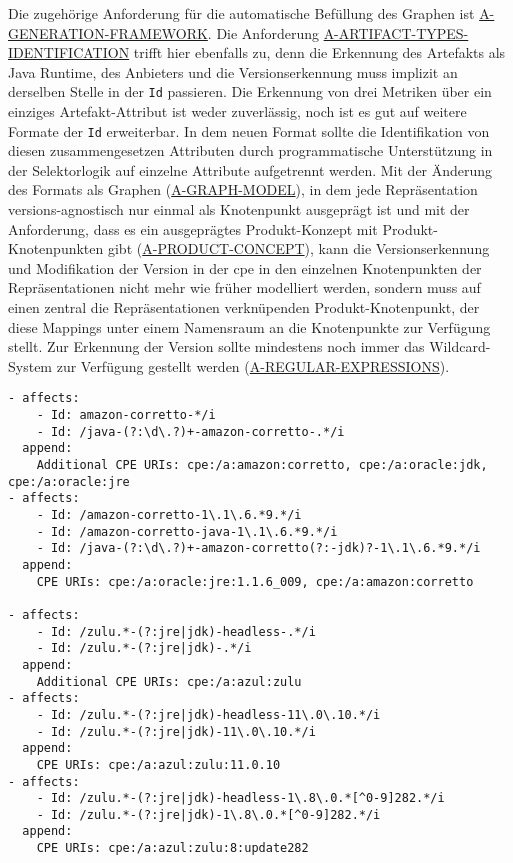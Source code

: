 Die zugehörige Anforderung für die automatische Befüllung des Graphen ist \hyperref[subsec:req-generated-data]{A-GENERATION-FRAMEWORK}.
Die Anforderung \hyperref[subsec:req-type-specific-matching]{A-ARTIFACT-TYPES-IDENTIFICATION} trifft hier ebenfalls zu, denn die Erkennung des Artefakts als Java Runtime, des Anbieters und die Versionserkennung muss implizit an derselben Stelle in der \texttt{Id} passieren.
Die Erkennung von drei Metriken über ein einziges Artefakt-Attribut ist weder zuverlässig, noch ist es gut auf weitere Formate der \texttt{Id} erweiterbar.
In dem neuen Format sollte die Identifikation von diesen zusammengesetzen Attributen durch programmatische Unterstützung in der Selektorlogik auf einzelne Attribute aufgetrennt werden.
Mit der Änderung des Formats als Graphen (\hyperref[subsec:req-format-product-graph]{A-GRAPH-MODEL}), in dem jede Repräsentation versions-agnostisch nur einmal als Knotenpunkt ausgeprägt ist und mit der Anforderung, dass es ein ausgeprägtes Produkt-Konzept mit Produkt-Knotenpunkten gibt (\hyperref[subsec:req-product-concept]{A-PRODUCT-CONCEPT}), kann die Versionserkennung und Modifikation der Version in der \acrshort{cpe} in den einzelnen Knotenpunkten der Repräsentationen nicht mehr wie früher modelliert werden, sondern muss auf einen zentral die Repräsentationen verknüpenden Produkt-Knotenpunkt, der diese Mappings unter einem Namensraum an die Knotenpunkte zur Verfügung stellt.
Zur Erkennung der Version sollte mindestens noch immer das Wildcard-System zur Verfügung gestellt werden (\hyperref[subsec:req-regex-support]{A-REGULAR-EXPRESSIONS}).

\begin{lstlisting}[style=yaml,caption={Java-Runtime-Korrelation mit Versionstransformation},label={lst:reference-case-java-runtimes},basicstyle=\ttfamily\scriptsize]
- affects:
    - Id: amazon-corretto-*/i
    - Id: /java-(?:\d\.?)+-amazon-corretto-.*/i
  append:
    Additional CPE URIs: cpe:/a:amazon:corretto, cpe:/a:oracle:jdk, cpe:/a:oracle:jre
- affects:
    - Id: /amazon-corretto-1\.1\.6.*9.*/i
    - Id: /amazon-corretto-java-1\.1\.6.*9.*/i
    - Id: /java-(?:\d\.?)+-amazon-corretto(?:-jdk)?-1\.1\.6.*9.*/i
  append:
    CPE URIs: cpe:/a:oracle:jre:1.1.6_009, cpe:/a:amazon:corretto

- affects:
    - Id: /zulu.*-(?:jre|jdk)-headless-.*/i
    - Id: /zulu.*-(?:jre|jdk)-.*/i
  append:
    Additional CPE URIs: cpe:/a:azul:zulu
- affects:
    - Id: /zulu.*-(?:jre|jdk)-headless-11\.0\.10.*/i
    - Id: /zulu.*-(?:jre|jdk)-11\.0\.10.*/i
  append:
    CPE URIs: cpe:/a:azul:zulu:11.0.10
- affects:
    - Id: /zulu.*-(?:jre|jdk)-headless-1\.8\.0.*[^0-9]282.*/i
    - Id: /zulu.*-(?:jre|jdk)-1\.8\.0.*[^0-9]282.*/i
  append:
    CPE URIs: cpe:/a:azul:zulu:8:update282
\end{lstlisting}


